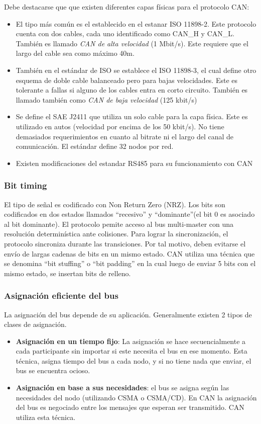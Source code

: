 Debe destacarse que que existen diferentes capas físicas para el protocolo CAN:
\begin{itemize}
\item El tipo más común es el establecido en el estanar ISO 11898-2. Este protocolo cuenta con dos cables, cada uno identificado como CAN\_H y CAN\_L. También es llamado \textit{CAN de alta velocidad} (1 Mbit/s). Este requiere que el largo del cable sea como máximo 40m.
\item También en el estándar de ISO se establece el ISO 11898-3, el cual define otro esquema de doble cable balanceado pero para bajas velocidades. Este es tolerante a fallas si alguno de los cables entra en corto circuito. También es llamado también como \textit{CAN de baja velocidad} (125 kbit/s)
\item Se define el SAE J2411 que utiliza un solo cable para la capa física. Este es utilizado en autos (velocidad por encima de los 50 kbit/s). No tiene demasiados requerimientos en cuanto al bitrate ni el largo del canal de comunicación. El estándar define 32 nodos por red.
\item Existen modificaciones del estandar RS485 para su funcionamiento con CAN
\end{itemize}

\subsubsection{Bit timing}
El tipo de señal es codificado con Non Return Zero (NRZ). Los bits son codificados en dos estados llamados ``recesivo'' y ``dominante''(el bit 0 es asociado al bit dominante). El protocolo pemite acceso al bus multi-master con una resolución determinística ante colisiones. Para lograr la sincronización, el protocolo sincroniza durante las transiciones. Por tal motivo, deben evitarse el envío de largas cadenas de bits en un mismo estado. CAN utiliza una técnica que se denomina ``bit stuffing'' o ``bit padding'' en la cual luego de enviar 5 bits con el mismo estado, se insertan bits de relleno.

\subsubsection{Asignación eficiente del bus}
La asignación del bus depende de su aplicación. Generalmente existen 2 tipos de clases de asignación.

\begin{itemize}
\item \textbf{Asignación en un tiempo fijo}: La asignación se hace secuencialmente a cada participante sin importar si este necesita el bus en ese momento. Esta técnica, asigna tiempo del bus a cada nodo, y si no tiene nada que enviar, el bus se encuentra ocioso.

\item \textbf{Asignación en base a sus necesidades}: el bus se asigna según las necesidades del nodo (utilizando CSMA o CSMA/CD). En CAN la asignación del bus es negociado entre los mensajes que esperan ser transmitido. CAN utiliza esta técnica.
\end{itemize}
